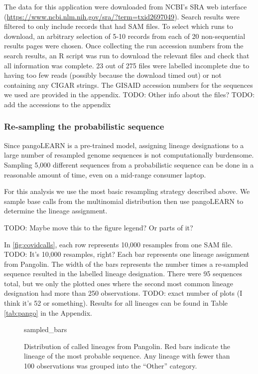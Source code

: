 \documentclass[10pt]{article}
\begin{document}
The data for this application were downloaded from NCBI's SRA web interface (\url{https://www.ncbi.nlm.nih.gov/sra/?term=txid2697049}).
Search results were filtered to only include records that had SAM files.
To select which runs to download, an arbitrary selection of 5-10 records from each of 20 non-sequential results pages were chosen.
Once collecting the run accession numbers from the search results, an R script was run to download the relevant files and check that all information was complete.
23 out of 275 files were labelled incomplete due to having too few reads (possibly because the download timed out) or not containing any CIGAR strings.
The GISAID accession numbers for the sequences we used are provided in the appendix. TODO: Other info about the files?
TODO: add the accessions to the appendix


\subsubsection{Re-sampling the probabilistic sequence}


Since pangoLEARN is a pre-trained model, assigning lineage designations to a large number of resampled genome sequences is not computationally burdensome.
Sampling 5,000 different sequences from a probabilistic sequence can be done in a reasonable amount of time, even on a mid-range consumer laptop.

For this analysis we use the most basic resampling strategy described above.
We sample base calls from the multinomial distribution then use pangoLEARN to determine the lineage assignment.

TODO: Maybe move this to the figure legend? Or parts of it? 

In \autoref{fig:covidcalls}, each row represents 10,000 resamples from one SAM file. TODO: It's 10,000 resamples, right?
Each bar represents one lineage assignment from Pangolin.
The width of the bars represents the number times a re-sampled sequence resulted in the labelled lineage designation.
There were 95 sequences total, but we only the plotted ones where the second most common lineage designation had more than 250 observations. TODO: exact number of plots (I think it's 52 or something).
Results for all lineages can be found in Table \ref{tab:pango} in the Appendix. 

\begin{figure}
sampled\_bars

\caption{\label{fig:covidcalls}Distribution of called lineages from Pangolin. Red bars indicate the lineage of the most probable sequence. Any lineage with fewer than 100 observations was grouped into the ``Other'' category.}
\end{figure}
\end{document}
